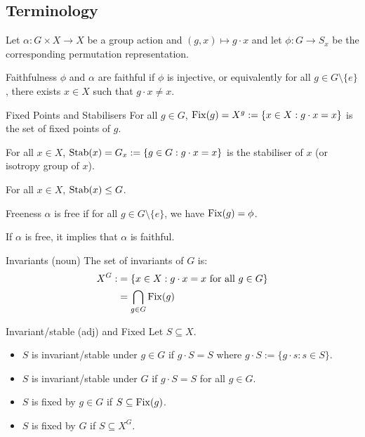 \documentclass{article}
\begin{document}
\subsection{Terminology}
Let $\alpha: G \times X\rightarrow X$ be a group action and $(g,x)\mapsto g\cdot x$ and let $\phi: G\rightarrow S_x$ be the corresponding permutation representation.
\begin{definition}{Faithfulness}
    $\phi$ and $\alpha$ are faithful if $\phi$ is injective, or equivalently for all $g\in G \setminus \{e\}$, there exists $x\in X$ such that $g\cdot x \neq x$.
\end{definition}
\begin{definition}{Fixed Points and Stabilisers}
    For all $g\in G$, $\operatorname{Fix}(g)=X^g:=\{x\in X: g\cdot x=x\}$ is the set of fixed points of $g$.
    \vspace{2mm}

    For all $x\in X$, $\operatorname{Stab}(x)=G_x:=\{g\in G: g\cdot x=x\}$ is the stabiliser of $x$ (or isotropy group of $x$).
\end{definition}
\begin{idea}
    For all $x\in X$, $\operatorname{Stab}(x) \le G$.
\end{idea}
\begin{definition}{Freeness}
    $\alpha$ is free if for all $g\in G \setminus \{e\}$, we have $\operatorname{Fix}(g) = \phi$.
\end{definition}
\begin{idea}
    If $\alpha$ is free, it implies that $\alpha$ is faithful.  
\end{idea}
\begin{definition}{Invariants (noun)}
    The set of invariants of $G$ is:
    \begin{align*}
        X^G :&= \{x\in X: g\cdot x=x \text{ for all }g\in G\} \\ 
        &= \bigcap_{g\in G}\operatorname{Fix}(g)
    \end{align*}
\end{definition}
\begin{definition}{Invariant/stable (adj) and Fixed}
    Let $S \subseteq X$.
    \begin{itemize}
        \item $S$ is invariant/stable under $g\in G$ if $g\cdot S = S$ where $g\cdot S := \{g\cdot s: s\in S\}$.
        \item $S$ is invariant/stable under $G$ if $g\cdot S = S$ for all $g\in G$.
        \item $S$ is fixed by $g\in G$ if $S\subseteq \operatorname{Fix}(g)$.
        \item $S$ is fixed by $G$ if $S\subseteq X^G$.
    \end{itemize}
\end{definition}
\end{document}
